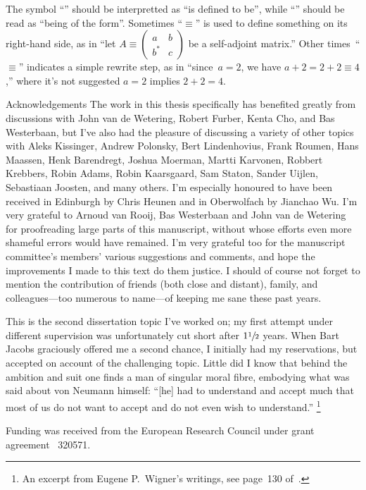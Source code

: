 \documentclass[b5paper]{book}
\begin{document}
\begin{parsec}{10}
\begin{point}{51}
    The symbol ``\Define{$:=$}''
should be interpretted as ``is defined to be'',
    while ``\Define{$\equiv$}''
should be read as ``being of the form''.
Sometimes ``$\equiv$'' is
used to define something on its right-hand side,
as in ``let $A\equiv\left(
\begin{smallmatrix} a&b\\b^* &c\end{smallmatrix}
\right)$ be a self-adjoint matrix.''
Other times~``$\equiv$''
indicates a simple rewrite step, as in
``since~$a=2$, we have $a+2=2+2\equiv 4$,''
where it's not suggested $a=2$ implies $2+2=4$.
\end{point}
\begin{point}{60}{Acknowledgements}
The work in this thesis specifically
has benefited greatly from
discussions
with John van de Wetering,
Robert Furber,
Kenta Cho,
and Bas Westerbaan,
but I've also had the pleasure
of discussing a variety
of other topics 
with 
Aleks Kissinger,
Andrew Polonsky,
Bert Lindenhovius,
Frank Roumen, 
Hans Maassen,
Henk Barendregt,
Joshua Moerman,
Martti Karvonen,
Robbert Krebbers,
Robin Adams, 
Robin Kaarsgaard,
Sam Staton, 
Sander Uijlen,
Sebastiaan Joosten,
and many others.
I'm especially honoured to have been received
in Edinburgh by Chris Heunen 
and in Oberwolfach
by Jianchao Wu.
I'm very grateful to
Arnoud van Rooij,
Bas Westerbaan
and
John van de Wetering
for proofreading large parts of
this manuscript,
without whose efforts
even more shameful errors would have remained.
I'm very grateful too for the manuscript committee's members' 
various suggestions and comments, and hope the improvements I made to this text
do them justice.
I should of course not forget to mention
the contribution
of friends (both close and distant),
family,
and colleagues---too numerous to name---of keeping me sane
these past years.

This is the second dissertation topic
I've worked on;
my first attempt
under different supervision
was unfortunately cut short after $1\sfrac{1}{2}$ years.
When Bart Jacobs graciously offered
me a second chance,
I initially had my reservations,
but accepted on account of the challenging topic.
Little did I know 
that behind the ambition and suit
	one finds a man
of singular moral fibre,
embodying
what was said
	about von Neumann himself:
	``[he] had to understand and accept much that most 
of us do not want to accept and do not even wish to understand.''%
\footnote{An excerpt from Eugene P.~Wigner's writings,
see page~130 of~\cite{wigner2013collected}.}
\end{point}
\begin{point}{70}{Funding} was received from the 
European Research Council under grant agreement \textnumero~320571.
\end{point}
\end{parsec}
\end{document}
